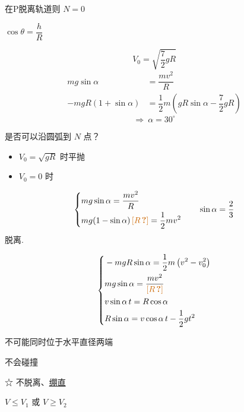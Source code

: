 在P脱离轨道则 $N=0$

$\cos\theta=\dfrac{h}{R}$

\[ V_0=\sqrt{\dfrac{7}{2}gR} \]
\begin{align*}
mg\sin\alpha&=\dfrac{mv^2}{R}\\
-mgR(1+\sin\alpha)&=\dfrac12m\left(gR\sin\alpha-\dfrac{7}{2}gR\right)
\end{align*}
\[ \Rightarrow\ \alpha=30^\circ \]

是否可以沿圆弧到 $N$ 点？
\begin{itemize}
\item $V_0=\sqrt{gR}$ 时平抛
\item $V_0=0$ 时
\end{itemize}
\[
\left\{\begin{aligned}
&mg\sin\alpha=\dfrac{mv^2}{R}\\
&mg(1-\sin\alpha)\,\unclear{R}=\dfrac12mv^2
\end{aligned}\right.
\qquad \sin\alpha=\dfrac23
\]
脱离.

\[
\left\{\begin{aligned}
&-mgR\sin\alpha=\dfrac12m\left(v^2-v_0^2\right)\\
&mg\sin\alpha=\dfrac{mv^2}{\unclear{R}}\\
&v\sin\alpha\,t=R\cos\alpha\\
&R\sin\alpha=v\cos\alpha\,t-\dfrac12gt^2
\end{aligned}\right.
\]


不可能同时位于水平直径两端

\quad 不会碰撞

\noindent ☆ 不脱离、\underline{绷直}

\noindent $V\le V_1$ 或 $V\ge V_2$

